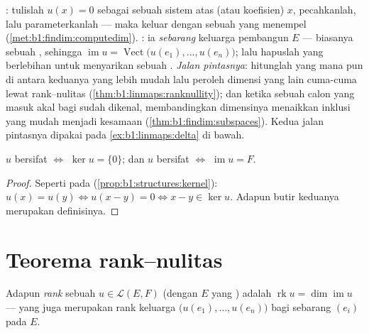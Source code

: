 \begin{method}
\label{met:b1:linmaps:kerim}
\emph{}: tulislah $u(x) = 0$ sebagai sebuah sistem atas 
(atau koefisien) $x$, pecahkanlah, lalu parameterkanlah --- maka 
keluar dengan sebuah  yang menempel
(\cref{met:b1:findim:computedim}). \emph{}: ia 
 \emph{sebarang} keluarga pembangun $E$ ---
biasanya sebuah , sehingga $\operatorname{im} u =
\operatorname{Vect}\bigl(u(e_1), \dots, u(e_n)\bigr)$; lalu
hapuslah  yang berlebihan untuk menyarikan sebuah . \emph{Jalan pintasnya}:
hitunglah yang mana pun di antara keduanya yang lebih mudah lalu peroleh dimensi yang lain
cuma-cuma lewat rank--nulitas
(\cref{thm:b1:linmaps:ranknullity}); dan ketika sebuah calon 
yang masuk akal bagi  sudah dikenal, membandingkan dimensinya menaikkan
inklusi yang mudah menjadi kesamaan
(\cref{thm:b1:findim:subspaces}). Kedua jalan pintasnya dipakai pada
\cref{ex:b1:linmaps:delta} di bawah.
\end{method}

\begin{proposition}\label{prop:b1:linmaps:kernel}
 $u$ bersifat  $\iff$ $\ker u = \{0\}$; dan $u$ bersifat  $\iff$
$\operatorname{im} u = F$.
\end{proposition}

\begin{proof}
Seperti pada  (\cref{prop:b1:structures:kernel}): $u(x) = u(y) \iff
u(x - y) = 0 \iff x - y \in \ker u$. Adapun butir keduanya merupakan
definisinya.
\end{proof}

\section{Teorema rank--nulitas}

\begin{definition}\label{def:b1:linmaps:rank}
Adapun \emph{rank} sebuah $u \in \mathcal{L}(E,
F)$ (dengan $E$ yang ) adalah $\operatorname{rk} u = \dim
\operatorname{im} u$ --- yang juga merupakan rank keluarga
$\bigl(u(e_1), \dots, u(e_n)\bigr)$ bagi sebarang  $(e_i)$ pada $E$.
\end{definition}

